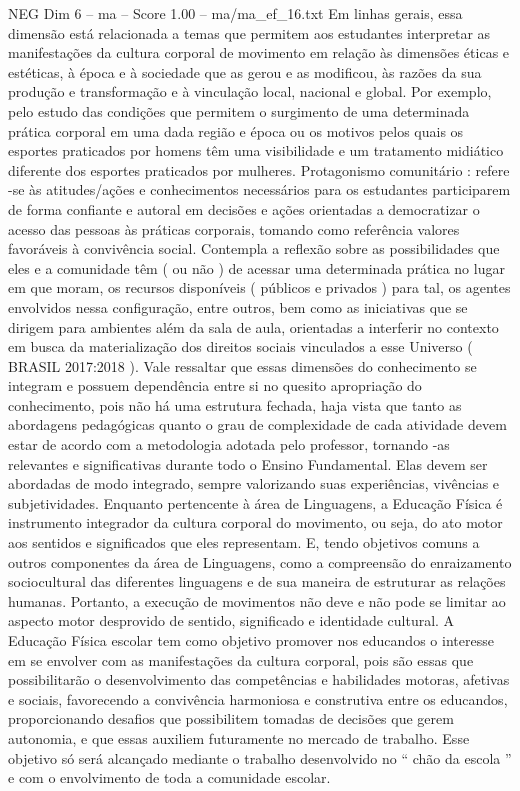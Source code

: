 \begin{textsample}{NEG Dim 6 – ma – Score 1.00 – ma/ma\_ef\_16.txt}
Em linhas gerais, essa dimensão está relacionada a temas que permitem aos estudantes interpretar as manifestações da cultura corporal de movimento em relação às dimensões éticas e estéticas, à época e à sociedade que as gerou e as modificou, às razões da sua produção e transformação e à vinculação local, nacional e global.
Por exemplo, pelo estudo das condições que permitem o surgimento de uma determinada prática corporal em uma dada região e época ou os motivos pelos quais os esportes praticados por homens têm uma visibilidade e um tratamento midiático diferente dos esportes praticados por mulheres.
Protagonismo comunitário : refere -se às atitudes/ações e conhecimentos necessários para os estudantes participarem de forma confiante e autoral em decisões e ações orientadas a democratizar o acesso das pessoas às práticas corporais, tomando como referência valores favoráveis à convivência social.
Contempla a reflexão sobre as possibilidades que eles e a comunidade têm ( ou não ) de acessar uma determinada prática no lugar em que moram, os recursos disponíveis ( públicos e privados ) para tal, os agentes envolvidos nessa configuração, entre outros, bem como as iniciativas que se dirigem para ambientes além da sala de aula, orientadas a interferir no contexto em busca da materialização dos direitos sociais vinculados a esse Universo ( BRASIL 2017:2018 ).
Vale ressaltar que essas dimensões do conhecimento se integram e possuem dependência entre si no quesito apropriação do conhecimento, pois não há uma estrutura fechada, haja vista que tanto as abordagens pedagógicas quanto o grau de complexidade de cada atividade devem estar de acordo com a metodologia adotada pelo professor, tornando -as relevantes e significativas durante todo o Ensino Fundamental.
Elas devem ser abordadas de modo integrado, sempre valorizando suas experiências, vivências e subjetividades.
Enquanto pertencente à área de Linguagens, a Educação Física é instrumento integrador da cultura corporal do movimento, ou seja, do ato motor aos sentidos e significados que eles representam.
E, tendo objetivos comuns a outros componentes da área de Linguagens, como a compreensão do enraizamento sociocultural das diferentes linguagens e de sua maneira de estruturar as relações humanas.
Portanto, a execução de movimentos não deve e não pode se limitar ao aspecto motor desprovido de sentido, significado e identidade cultural.
A Educação Física escolar tem como objetivo promover nos educandos o interesse em se envolver com as manifestações da cultura corporal, pois são essas que possibilitarão o desenvolvimento das competências e habilidades motoras, afetivas e sociais, favorecendo a convivência harmoniosa e construtiva entre os educandos, proporcionando desafios que possibilitem tomadas de decisões que gerem autonomia, e que essas auxiliem futuramente no mercado de trabalho.
Esse objetivo só será alcançado mediante o trabalho desenvolvido no “ chão da escola ” e com o envolvimento de toda a comunidade escolar.

\end{textsample}
